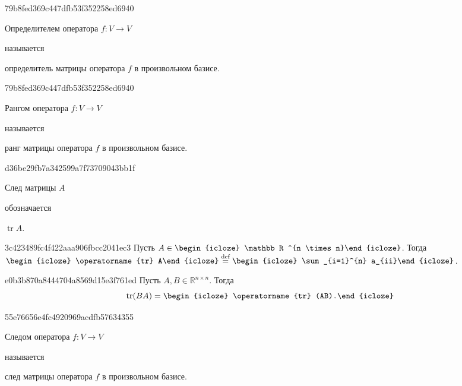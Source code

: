 \begin{note}{79b8fed369c447dfb53f352258ed6940}
    \begin{icloze}{2}Определителем оператора \( f : V \to V \)\end{icloze} называется \begin{icloze}{1}о\-пре\-де\-ли\-тель матрицы оператора \( f \) в произвольном базисе.\end{icloze}
\end{note}

\begin{note}{79b8fed369c447dfb53f352258ed6940}
    \begin{icloze}{2}Рангом оператора \( f : V \to V \)\end{icloze} называется \begin{icloze}{1}ранг матрицы оператора \( f \) в произвольном базисе.\end{icloze}
\end{note}

\begin{note}{d36be29fb7a342599a7f73709043bb1f}
    \begin{icloze}{2}След матрицы \( A \)\end{icloze} обозначается \begin{icloze}{1}\( \operatorname{tr}  A \).\end{icloze}
\end{note}

\begin{note}{3c423489fc4f422aaa906fbcc2041ec3}
    Пусть \( A \in \begin{icloze}{3}\mathbb R ^{n \times n}\end{icloze} \). Тогда \( \displaystyle \begin{icloze}{2}\operatorname{tr} A\end{icloze} \overset{\text{def}}= \begin{icloze}{1}\sum_{i=1}^{n} a_{ii}\end{icloze} \).
\end{note}

\begin{note}{e0b3b870a8444704a8569d15e3f761ed}
    Пусть \({ A, B \in \mathbb R^{n \times n} }\). Тогда
    \[
        \operatorname{tr} (BA) = \begin{icloze}{1}\operatorname{tr} (AB).\end{icloze}
    \]
\end{note}

\begin{note}{55e76656e4fc4920969acdfb57634355}
    \begin{icloze}{2}Следом оператора \( f : V \to V \)\end{icloze} называется \begin{icloze}{1}след матрицы оператора \( f \) в произвольном базисе.\end{icloze}
\end{note}

